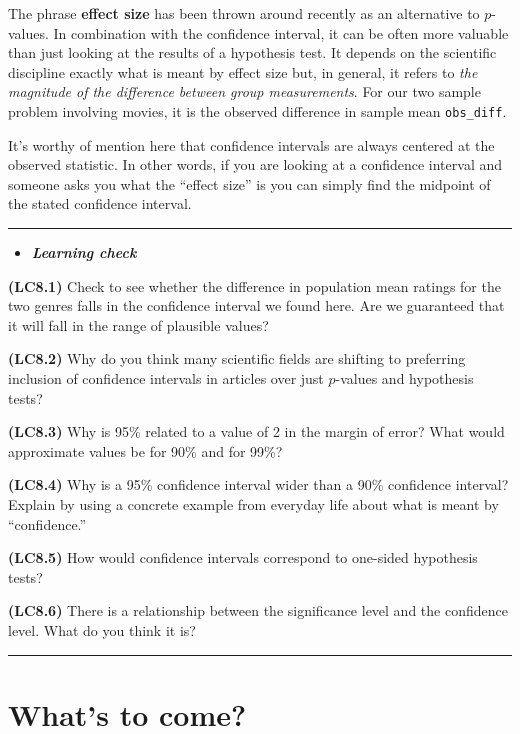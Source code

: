 \documentclass[]{tufte-book}
\let\oldrule=\rule
\renewcommand{\rule}[1]{\oldrule{\linewidth}}
\newenvironment{rmdblock}[1]
  {\begin{shaded*}
  \begin{itemize}
  \renewcommand{\labelitemi}{
    \raisebox{-.7\height}[0pt][0pt]{
    }
  }
  \item
  }
  {
  \end{itemize}
  \end{shaded*}
  }
\newenvironment{learncheck}
  {\begin{rmdblock}{warning}}
  {\end{rmdblock}}
\begin{document}
The phrase \textbf{effect size} has been thrown around recently as an
alternative to \(p\)-values. In combination with the confidence
interval, it can be often more valuable than just looking at the results
of a hypothesis test. It depends on the scientific discipline exactly
what is meant by effect size but, in general, it refers to \emph{the
magnitude of the difference between group measurements}. For our two
sample problem involving movies, it is the observed difference in sample
mean \texttt{obs\_diff}.

It's worthy of mention here that confidence intervals are always
centered at the observed statistic. In other words, if you are looking
at a confidence interval and someone asks you what the ``effect size''
is you can simply find the midpoint of the stated confidence interval.

\begin{center}\rule{0.5\linewidth}{\linethickness}\end{center}

\begin{learncheck}
\textbf{\emph{Learning check}}
\end{learncheck}

\textbf{(LC8.1)} Check to see whether the difference in population mean
ratings for the two genres falls in the confidence interval we found
here. Are we guaranteed that it will fall in the range of plausible
values?

\textbf{(LC8.2)} Why do you think many scientific fields are shifting to
preferring inclusion of confidence intervals in articles over just
\(p\)-values and hypothesis tests?

\textbf{(LC8.3)} Why is 95\% related to a value of 2 in the margin of
error? What would approximate values be for 90\% and for 99\%?

\textbf{(LC8.4)} Why is a 95\% confidence interval wider than a 90\%
confidence interval? Explain by using a concrete example from everyday
life about what is meant by ``confidence.''

\textbf{(LC8.5)} How would confidence intervals correspond to one-sided
hypothesis tests?

\textbf{(LC8.6)} There is a relationship between the significance level
and the confidence level. What do you think it is?

\begin{center}\rule{0.5\linewidth}{\linethickness}\end{center}

\section{What's to come?}\label{whats-to-come-5}
\end{document}
